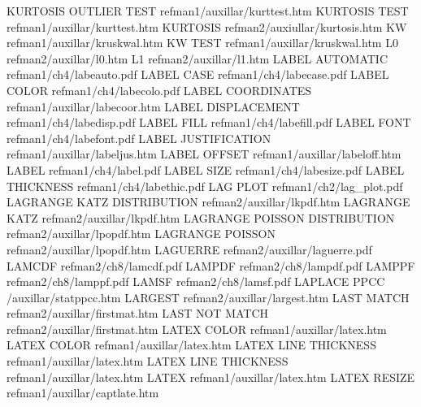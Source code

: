 KURTOSIS OUTLIER TEST                   refman1/auxillar/kurttest.htm
KURTOSIS TEST                           refman1/auxillar/kurttest.htm
KURTOSIS                                refman2/auxiullar/kurtosis.htm
KW                                      refman1/auxillar/kruskwal.htm
KW TEST                                 refman1/auxillar/kruskwal.htm
L0                                      refman2/auxillar/l0.htm
L1                                      refman2/auxillar/l1.htm
LABEL AUTOMATIC                         refman1/ch4/labeauto.pdf
LABEL CASE                              refman1/ch4/labecase.pdf
LABEL COLOR                             refman1/ch4/labecolo.pdf
LABEL COORDINATES                       refman1/auxillar/labecoor.htm
LABEL DISPLACEMENT                      refman1/ch4/labedisp.pdf
LABEL FILL                              refman1/ch4/labefill.pdf
LABEL FONT                              refman1/ch4/labefont.pdf
LABEL JUSTIFICATION                     refman1/auxillar/labeljus.htm
LABEL OFFSET                            refman1/auxillar/labeloff.htm
LABEL                                   refman1/ch4/label.pdf
LABEL SIZE                              refman1/ch4/labesize.pdf
LABEL THICKNESS                         refman1/ch4/labethic.pdf
LAG PLOT                                refman1/ch2/lag_plot.pdf
LAGRANGE KATZ DISTRIBUTION              refman2/auxillar/lkpdf.htm
LAGRANGE KATZ                           refman2/auxillar/lkpdf.htm
LAGRANGE POISSON DISTRIBUTION           refman2/auxillar/lpopdf.htm
LAGRANGE POISSON                        refman2/auxillar/lpopdf.htm
LAGUERRE                                refman2/auxillar/laguerre.pdf
LAMCDF                                  refman2/ch8/lamcdf.pdf
LAMPDF                                  refman2/ch8/lampdf.pdf
LAMPPF                                  refman2/ch8/lamppf.pdf
LAMSF                                   refman2/ch8/lamsf.pdf
LAPLACE PPCC                            /auxillar/statppcc.htm
LARGEST                                 refman2/auxillar/largest.htm
LAST MATCH                              refman2/auxillar/firstmat.htm
LAST NOT MATCH                          refman2/auxillar/firstmat.htm
LATEX COLOR                             refman1/auxillar/latex.htm
LATEX COLOR                             refman1/auxillar/latex.htm
LATEX LINE THICKNESS                    refman1/auxillar/latex.htm
LATEX LINE THICKNESS                    refman1/auxillar/latex.htm
LATEX                                   refman1/auxillar/latex.htm
LATEX RESIZE                            refman1/auxillar/captlate.htm
